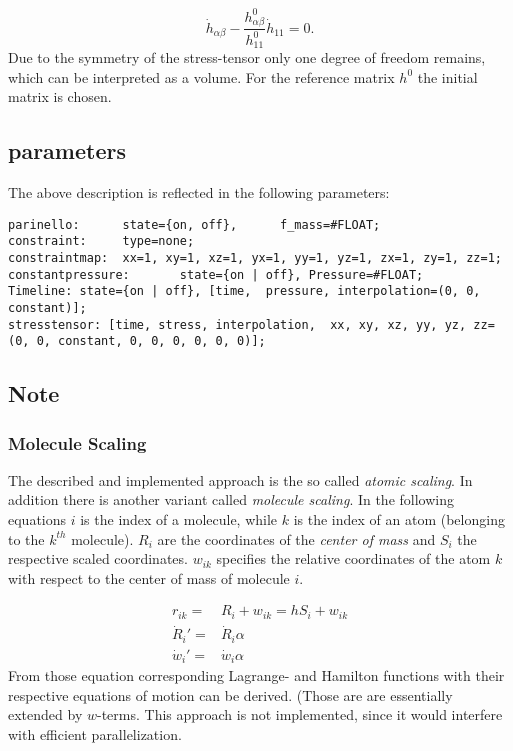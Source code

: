 \begin{equation}
  \dot{h}_{\alpha \beta} - \frac{h_{\alpha \beta}^0}{h_{11}^0}\dot{h}_{11}= 0
  .
\end{equation}
Due to the symmetry of the stress-tensor only one degree of freedom remains, which can be interpreted as a volume. For the reference matrix \( h^0 \) the initial matrix is chosen. 


\subsection{parameters}
The above description is reflected in the following parameters:
{\small 
\begin{lstlisting}
parinello:      state={on, off},      f_mass=#FLOAT;
constraint:     type=none;
constraintmap:  xx=1, xy=1, xz=1, yx=1, yy=1, yz=1, zx=1, zy=1, zz=1;
constantpressure:       state={on | off}, Pressure=#FLOAT;
Timeline: state={on | off}, [time,  pressure, interpolation=(0, 0, constant)];
stresstensor: [time, stress, interpolation,  xx, xy, xz, yy, yz, zz=(0, 0, constant, 0, 0, 0, 0, 0, 0)];
\end{lstlisting}
}

\subsection{Note}
\subsubsection{Molecule Scaling}
The described and implemented approach is the so called \textit{atomic scaling}. In addition there is another variant called \textit{molecule scaling}. In the following equations $i$ 
is the index of a molecule, while $k$ is the index of an atom (belonging to the $k^{th}$ molecule).
\(R_{i}\) are the coordinates of the \textit{center of mass} and $S_i$ the respective scaled coordinates.
$w_{ik}$ specifies the relative coordinates of the atom $k$ with respect to the center of mass of molecule $i$.

\begin{equation}
  \begin{split}
    r_{ik} =
    & R_{i} +w_{ik} = hS_i + w_{ik}\\
    \dot{R}_{i}' =
    & \dot{R}_{i}\alpha \\
    \dot{w}_{i}' =
    & \dot{w}_{i}\alpha
  \end{split}
\end{equation}
From those equation corresponding Lagrange- and Hamilton functions with their respective equations of motion can be derived. (Those are are essentially extended by \glqq$w$-terms\grqq. This approach is not implemented, since it would interfere with efficient parallelization.

